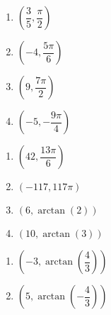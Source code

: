 \documentclass{ximera}
\begin{document}
\begin{multicols}{4} 

\begin{enumerate}

\setcounter{enumi}{\value{HW}}

\item $\left( \dfrac{3}{5}, \dfrac{\pi}{2} \right)$
\item $\left( -4, \dfrac{5\pi}{6} \right)$
\item $\left( 9, \dfrac{7\pi}{2} \right)$
\item $\left( -5, -\dfrac{9\pi}{4} \right)$

\setcounter{HW}{\value{enumi}}

\end{enumerate}

\end{multicols}

\begin{multicols}{4} 

\begin{enumerate}

\setcounter{enumi}{\value{HW}}

\item $\left( 42, \dfrac{13\pi}{6} \right)$
\item $\left( -117, 117\pi \right)$ 
\item $\left( 6, \arctan(2) \right)$ 
\item $\left(10, \arctan(3) \right)$ 

\setcounter{HW}{\value{enumi}}

\end{enumerate}

\end{multicols}

\begin{multicols}{2} 

\begin{enumerate}

\setcounter{enumi}{\value{HW}}

\item $\left( -3, \arctan\left(\dfrac{4}{3}\right) \right)$ 
\item $\left( 5, \arctan\left(-\dfrac{4}{3}\right) \right)$ 

\setcounter{HW}{\value{enumi}}

\end{enumerate}

\end{multicols}
\end{document}
